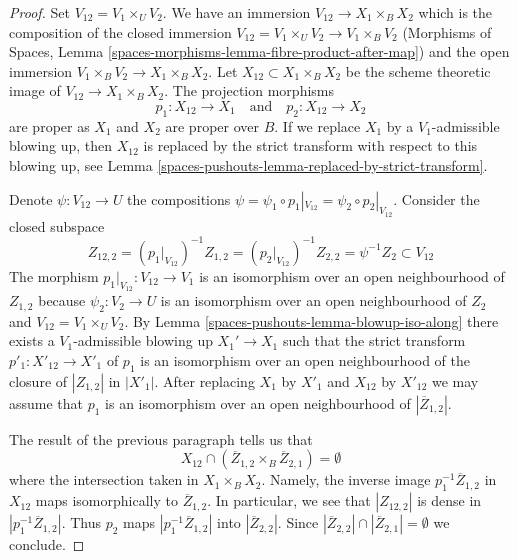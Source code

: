 \begin{proof}
\medskip\noindent
Set $V_{12} = V_1 \times_U V_2$. We have an immersion
$V_{12} \to X_1 \times_B X_2$ which is the composition of the closed
immersion $V_{12} = V_1 \times_U V_2 \to V_1 \times_B V_2$
(Morphisms of Spaces, Lemma
\ref{spaces-morphisms-lemma-fibre-product-after-map})
and the open immersion $V_1 \times_B V_2 \to X_1 \times_B X_2$.
Let $X_{12} \subset X_1 \times_B X_2$ be the scheme theoretic image of
$V_{12} \to X_1 \times_B X_2$. The projection morphisms
$$
p_1 : X_{12} \to X_1
\quad\text{and}\quad
p_2 : X_{12} \to X_2
$$
are proper as $X_1$ and $X_2$ are proper over $B$. If we replace $X_1$ by a
$V_1$-admissible blowing up, then $X_{12}$ is replaced by
the strict transform with respect to this blowing up, see
Lemma \ref{spaces-pushouts-lemma-replaced-by-strict-transform}.

\medskip\noindent
Denote $\psi : V_{12} \to U$ the compositions
$\psi = \psi_1 \circ p_1|_{V_{12}} = \psi_2 \circ p_2|_{V_{12}}$.
Consider the closed subspace
$$
Z_{12, 2} =
(p_1|_{V_{12}})^{-1}Z_{1, 2} =
(p_2|_{V_{12}})^{-1}Z_{2, 2} =
\psi^{-1}Z_2 \subset V_{12}
$$
The morphism $p_1|_{V_{12}} : V_{12} \to V_1$ is an isomorphism
over an open neighbourhood of $Z_{1, 2}$ because $\psi_2 : V_2 \to U$
is an isomorphism over an open neighbourhood of $Z_2$ and
$V_{12} = V_1 \times_U V_2$. By Lemma \ref{spaces-pushouts-lemma-blowup-iso-along}
there exists a $V_1$-admissible blowing up $X_1' \to X_1$
such that the strict transform $p'_1 : X'_{12} \to X'_1$
of $p_1$ is an isomorphism over an open neighbourhood of
the closure of $|Z_{1, 2}|$ in $|X'_1|$.
After replacing $X_1$ by $X'_1$ and $X_{12}$ by $X'_{12}$
we may assume that $p_1$ is an isomorphism over an open
neighbourhood of $|\overline{Z}_{1, 2}|$.

\medskip\noindent
The result of the previous paragraph tells us that
$$
X_{12} \cap (\overline{Z}_{1, 2} \times_B \overline{Z}_{2, 1}) = \emptyset
$$
where the intersection taken in $X_1 \times_B X_2$. Namely, the inverse
image $p_1^{-1}\overline{Z}_{1, 2}$ in $X_{12}$ maps isomorphically
to $\overline{Z}_{1, 2}$. In particular, we see that $|Z_{12, 2}|$
is dense in $|p_1^{-1}\overline{Z}_{1, 2}|$. Thus $p_2$ maps
$|p_1^{-1}\overline{Z}_{1, 2}|$ into $|\overline{Z}_{2, 2}|$.
Since $|\overline{Z}_{2, 2}| \cap |\overline{Z}_{2, 1}| = \emptyset$
we conclude.


\end{proof}
